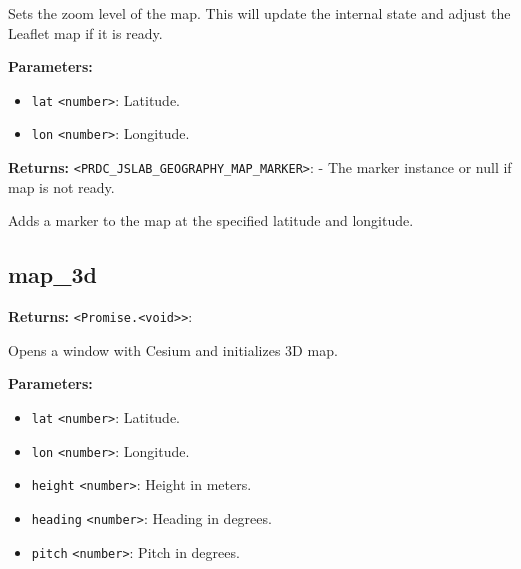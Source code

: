 \documentclass[12pt,a4paper]{article}
\begin{document}
\noindent Sets the zoom level of the map.
This will update the internal state and adjust the Leaflet map if it is ready.

\vspace{5mm}
\noindent {}


\noindent \textbf{Parameters:}
\begin{itemize}
  \item \texttt{lat} \texttt{<number>}: Latitude.
  \item \texttt{lon} \texttt{<number>}: Longitude.
\end{itemize}

\noindent \textbf{Returns:} \texttt{<PRDC\_JSLAB\_GEOGRAPHY\_MAP\_MARKER>}: - The marker instance or null if map is not ready.

\noindent Adds a marker to the map at the specified latitude and longitude.


\subsection{map\_3d}
\vspace{5mm}
\noindent {}


\noindent \textbf{Returns:} \texttt{<Promise.<void>>}:

\noindent Opens a window with Cesium and initializes 3D map.

\vspace{5mm}
\noindent {}


\noindent \textbf{Parameters:}
\begin{itemize}
  \item \texttt{lat} \texttt{<number>}: Latitude.
  \item \texttt{lon} \texttt{<number>}: Longitude.
  \item \texttt{height} \texttt{<number>}: Height in meters.
  \item \texttt{heading} \texttt{<number>}: Heading in degrees.
  \item \texttt{pitch} \texttt{<number>}: Pitch in degrees.
\end{itemize}
\end{document}
